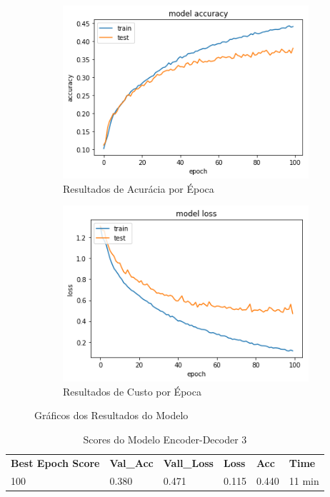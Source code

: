 \begin{figure}[h]
  \centering
  \begin{subfigure}[b]{0.45\linewidth}
    \includegraphics[width=\linewidth]{img/enc-dec-3.png}
    \caption{Resultados de Acurácia por Época}
  \end{subfigure}
  \begin{subfigure}[b]{0.45\linewidth}
    \includegraphics[width=\linewidth]{img/enc-dec-3-loss.png}
    \caption{Resultados de Custo por Época}
  \end{subfigure}
  \caption{Gráficos dos Resultados do Modelo}
  \label{fig:plots3}
\end{figure}

\begin{table}[h]
\centering
\begin{tabular}{llllll}
\textbf{Best Epoch Score} & \textbf{Val\_Acc} & \textbf{Vall\_Loss} & \textbf{Loss} & \textbf{Acc} & \textbf{Time} \\
100 & 0.380 & 0.471 & 0.115 & 0.440 & 11 min
\end{tabular}
\caption{Scores do Modelo Encoder-Decoder 3}
\label{tab:res-enc-dec-3}
\end{table}

